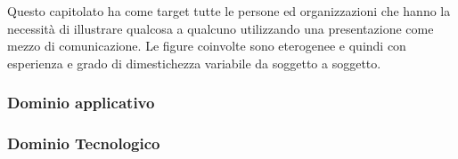 Questo capitolato ha come target tutte le persone ed organizzazioni che hanno la necessità di illustrare qualcosa a qualcuno utilizzando una presentazione come mezzo di comunicazione.
Le figure coinvolte sono eterogenee e quindi con esperienza e grado di dimestichezza variabile da soggetto a soggetto. 

\subsubsection{Dominio applicativo}


\subsubsection{Dominio Tecnologico}

